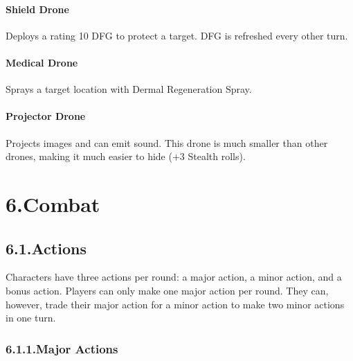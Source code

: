 \documentclass{article}
\begin{document}
\paragraph{Shield Drone}\label{sec-shield-drone}%

\noindent{}Deploys a rating 10 DFG to protect a target. DFG is refreshed every other turn.%

\paragraph{Medical Drone}\label{sec-medical-drone}%

\noindent{}Sprays a target location with Dermal Regeneration Spray.%

\paragraph{Projector Drone}\label{sec-projector-drone}%

\noindent{}Projects images and can emit sound. This drone is much smaller than other drones, making it much easier to hide (+3 Stealth rolls).%

\mdhr{}%

\section{6.\hspace*{0.5em}Combat}\label{sec-combat}%

\subsection{6.1.\hspace*{0.5em}Actions}\label{sec-actions}%

\noindent{}Characters have three actions per round: a major action, a minor action, and a bonus action. Players can only make one major action per round. They can, however, trade their major action for a minor action to make two minor actions in one turn.%

\subsubsection{6.1.1.\hspace*{0.5em}Major Actions}\label{sec-major-actions}%
\end{document}
